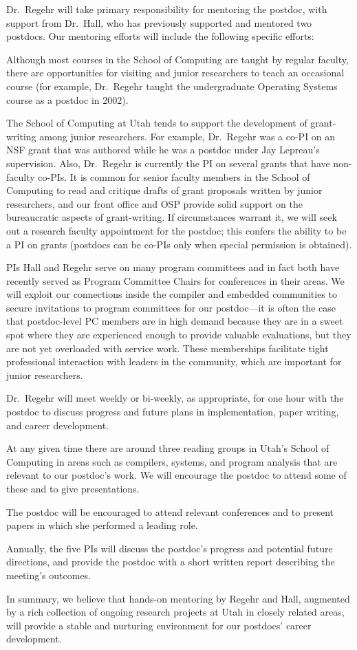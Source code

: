 Dr.~Regehr will take primary responsibility for mentoring the
postdoc, with support from Dr.~Hall, who has previously supported and
mentored two postdocs.
%
Our mentoring efforts will include the following specific efforts:
%
\begin{compactitem}
%
\item
%
Although most courses in the School of Computing are taught by regular
faculty, there are opportunities for visiting and junior researchers
to teach an occasional course (for example, Dr.~Regehr taught the
undergraduate Operating Systems course as a postdoc in 2002).
%
\item
%
The School of Computing at Utah tends to support the
development of grant-writing among junior researchers. 
%
For example, Dr.~Regehr was a co-PI on an NSF grant that was authored
while he was a postdoc under Jay Lepreau's supervision.
%
Also, Dr.~Regehr is currently the PI on several grants that have
non-faculty co-PIs.
%
It is common for senior faculty members in the School of Computing to
read and critique drafts of grant proposals written by junior
researchers, and our front office and OSP provide solid support on the
bureaucratic aspects of grant-writing.
%
If circumstances warrant it, we will seek out a research faculty
appointment for the postdoc; this confers the ability to be a PI on
grants (postdocs can be co-PIs only when special permission is
obtained).
%
\item
%
PIs Hall and Regehr serve on many program committees and in fact both
have recently served as Program Committee Chairs for conferences in
their areas.
%
We will exploit our connections inside the compiler and embedded
communities to secure invitations to program committees for our
postdoc---it is often the case that postdoc-level PC members are in
high demand because they are in a sweet spot where they are
experienced enough to provide valuable evaluations, but they are not
yet overloaded with service work.
%
These memberships facilitate tight professional interaction with
leaders in the community, which are important for junior researchers.
%
\item
%
Dr.~Regehr will meet weekly or bi-weekly, as appropriate, for one hour
with the postdoc to discuss progress and future plans in
implementation, paper writing, and career development.
%
\item
%
At any given time there are around three reading groups in Utah's
School of Computing in areas such as compilers, systems, and program
analysis that are relevant to our postdoc's work.
%
We will encourage the postdoc to attend some of these and to give
presentations.
%
\item
%
The postdoc will be encouraged to attend relevant conferences and to
present papers in which she performed a leading role.
%
\item
%
Annually, the five PIs will discuss the postdoc's progress and
potential future directions, and provide the postdoc with a short
written report describing the meeting's outcomes.
%
\end{compactitem}

In summary, we believe that hands-on mentoring by Regehr and Hall,
augmented by a rich collection of ongoing research projects at Utah in
closely related areas, will provide a stable and nurturing environment
for our postdocs' career development.
